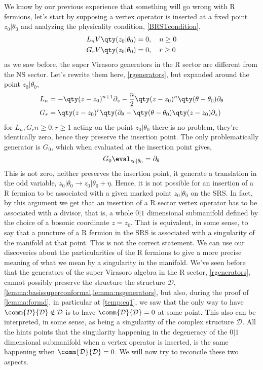 We know by our previous experience that something will go wrong with R fermions, let's start by supposing a 
vertex operator is inserted at a fixed point $z_0|\theta_0$ and analyzing the physicality 
condition, \cref{BRSTcondition},
\begin{align*}
    L_n V\qty(z_0|\theta_0)&=0,\ \ \ n\geq 0\\
    G_r V\qty(z_0|\theta_0)&=0,\ \ \ r\geq 0
\end{align*}
as we saw before, the super Virasoro generators in the R sector are different from the NS sector. Let's rewrite them here, \cref{rgenerators}, but expanded around 
the point $z_0|\theta_0$,
\begin{align*}
    L_n&=-\qty(z-z_0)^{n+1}\partial_z-\frac{n}{2}\qty(z-z_0)^n\qty(\theta-\theta_0)\partial_\theta\\
    G_r&=\qty(z-z_0)^{r}\qty(\partial_\theta-\qty(\theta-\theta_0)\qty(z-z_0)\partial_z)
\end{align*} 
for $L_n,G_r n\geq0,r\geq 1$ acting on the point $z_0|\theta_0$ there is no problem, they're identically zero, hence they preserve 
the insertion point. The only problematically generator is $G_0$, which when evaluated at the insertion point gives,
\[G_0\eval_{z_0|\theta_0}=\partial_\theta\]
This is not zero, neither preserves the insertion point, it generate a translation in the odd variable, 
$z_0|\theta_0\rightarrow z_0|\theta_0+\eta$. Hence, it is not possible for an insertion of a R fermion to be 
associated with a given marked point $z_0|\theta_0$ on the SRS. In fact, by this argument we get that an insertion 
of a R sector vertex operator has to be associated with a divisor, that is, a whole $0|1$ dimensional submanifold 
defined by the choice of a bosonic coordinate $z=z_0$. That is equivalent, in some sense, to say that a puncture of 
a R fermion in the SRS is associated with a singularity of the manifold at that point. This is not the correct statement. 
We can use our discoveries about the particularities of the R fermions to give a more precise meaning of what we mean 
by a singularity in the manifold. We've seen before that the generators of the super Virasoro algebra in the R sector, 
\cref{rgenerators}, cannot possibly preserve the structure the structure $\mathcal D$, \cref{lemma:basissuperconformal,lemma:nsgenerators}, 
but also, during the proof of \cref{lemma:formd}, in particular at \cref{temp:eq1}, we saw that the only way to have 
$\comm{\mathcal D}{\mathcal D}\notin\mathcal D$ is to have $\comm{\mathcal D}{\mathcal D}=0$ at some point. This also can be interpreted, 
in some sense, as being a singularity of the complex structure $\mathcal D$. All the hints points that the singularity 
happening in the degeneracy of the $0|1$ dimensional submanifold when a vertex operator is inserted, is the same 
happening when $\comm{\mathcal D}{\mathcal D}=0$. We will now try to reconcile these two aspects.

